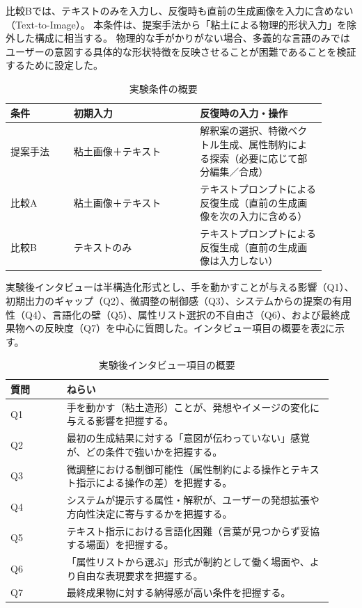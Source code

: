 \documentclass{kuisthesis}
\begin{document}
比較Bでは、テキストのみを入力し、反復時も直前の生成画像を入力に含めない（Text-to-Image）。
本条件は、提案手法から「粘土による物理的形状入力」を除外した構成に相当する。
物理的な手がかりがない場合、多義的な言語のみではユーザーの意図する具体的な形状特徴を反映させることが困難であることを検証するために設定した。

\begin{table}[H]
  \centering
  \caption{実験条件の概要}
  \label{tab:conditions}
  \begin{tabular}{|p{0.18\linewidth}|p{0.36\linewidth}|p{0.36\linewidth}|}
    \hline
    条件 & 初期入力 & 反復時の入力・操作 \\
    \hline
    提案手法 & 粘土画像＋テキスト & 解釈案の選択、特徴ベクトル生成、属性制約による探索（必要に応じて部分編集／合成） \\
    \hline
    比較A & 粘土画像＋テキスト & テキストプロンプトによる反復生成（直前の生成画像を次の入力に含める） \\
    \hline
    比較B & テキストのみ & テキストプロンプトによる反復生成（直前の生成画像は入力しない） \\
    \hline
  \end{tabular}
\end{table}

実験後インタビューは半構造化形式とし、手を動かすことが与える影響（Q1）、初期出力のギャップ（Q2）、微調整の制御感（Q3）、システムからの提案の有用性（Q4）、言語化の壁（Q5）、属性リスト選択の不自由さ（Q6）、および最終成果物への反映度（Q7）を中心に質問した。インタビュー項目の概要を表\ref{tab:interview}に示す。

\begin{table}[H]
  \centering
  \caption{実験後インタビュー項目の概要}
  \label{tab:interview}
  \begin{tabular}{|p{0.16\linewidth}|p{0.76\linewidth}|}
    \hline
    質問 & ねらい \\
    \hline
    Q1 & 手を動かす（粘土造形）ことが、発想やイメージの変化に与える影響を把握する。 \\
    \hline
    Q2 & 最初の生成結果に対する「意図が伝わっていない」感覚が、どの条件で強いかを把握する。 \\
    \hline
    Q3 & 微調整における制御可能性（属性制約による操作とテキスト指示による操作の差）を把握する。 \\
    \hline
    Q4 & システムが提示する属性・解釈が、ユーザーの発想拡張や方向性決定に寄与するかを把握する。 \\
    \hline
    Q5 & テキスト指示における言語化困難（言葉が見つからず妥協する場面）を把握する。 \\
    \hline
    Q6 & 「属性リストから選ぶ」形式が制約として働く場面や、より自由な表現要求を把握する。 \\
    \hline
    Q7 & 最終成果物に対する納得感が高い条件を把握する。 \\
    \hline
  \end{tabular}
\end{table}
\end{document}

